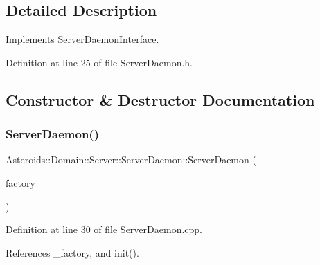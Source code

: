 \subsection{Detailed Description}
Implements \hyperlink{classAsteroids_1_1Domain_1_1Server_1_1ServerDaemonInterface}{Server\+Daemon\+Interface}. 

Definition at line 25 of file Server\+Daemon.\+h.



\subsection{Constructor \& Destructor Documentation}
\mbox{\label{classAsteroids_1_1Domain_1_1Server_1_1ServerDaemon_adb13a988eee60960a1994277ef35de7c}} 
\subsubsection{\texorpdfstring{Server\+Daemon()}{ServerDaemon()}}
{\footnotesize\ttfamily Asteroids\+::\+Domain\+::\+Server\+::\+Server\+Daemon\+::\+Server\+Daemon (\begin{DoxyParamCaption}\item[{std\+::shared\+\_\+ptr$<$ \hyperlink{classAsteroids_1_1Domain_1_1Factory_1_1FactoryInterface}{Asteroids\+::\+Domain\+::\+Factory\+::\+Factory\+Interface} $>$}]{factory }\end{DoxyParamCaption})}



Definition at line 30 of file Server\+Daemon.\+cpp.



References \+\_\+factory, and init().

